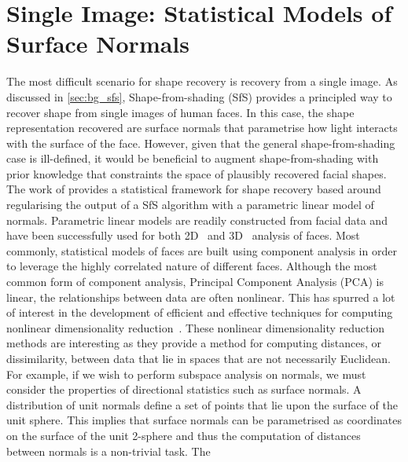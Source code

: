 \chapter{Single Image: Statistical Models of Surface Normals}\label{ch:singl_imag}
\minitoc{}
The most difficult scenario for shape recovery is recovery from a single
image. As discussed in \cref{sec:bg_sfs}, Shape-from-shading (SfS) provides a
principled way to recover shape from single images of human faces. In this case,
the shape representation recovered are surface normals that parametrise how
light interacts with the surface of the face. However, given that the general
shape-from-shading case is ill-defined, it would be beneficial to augment
shape-from-shading with prior knowledge that constraints the space of plausibly
recovered facial shapes. The work of \citet{smith2006recovering,smith2008facial}
provides a statistical framework for shape recovery based around regularising
the output of a SfS algorithm with a parametric linear model of normals.
Parametric linear models are readily constructed from facial data and have
been successfully used for both 2D~\cite{cootes2001active,turk1991eigenfaces}
and 3D~\cite{enciso1999synthesis,atick1996statistical} analysis of faces.
Most commonly, statistical models of faces are built using component analysis
in order to leverage the highly correlated nature of different faces. Although
the most common form of component analysis, Principal Component Analysis (PCA)
is linear, the relationships between data are often nonlinear.
This has spurred a lot of interest in the development of
efficient and effective techniques for computing nonlinear dimensionality
reduction~\cite{yang2005kpca,goudelis2007class,scholkopf1998nonlinear}. These
nonlinear dimensionality reduction methods are interesting as they provide
a method for computing distances, or dissimilarity, between data that
lie in spaces that are not necessarily Euclidean. For example, if we wish to
perform subspace analysis on normals, we must consider the properties of
directional statistics such as surface normals.
A distribution of unit normals define a set of points that lie upon the
surface of the unit sphere. This implies that surface normals can be
parametrised as coordinates on the surface of the unit 2-sphere and thus
the computation of distances between normals is a non-trivial task. The
